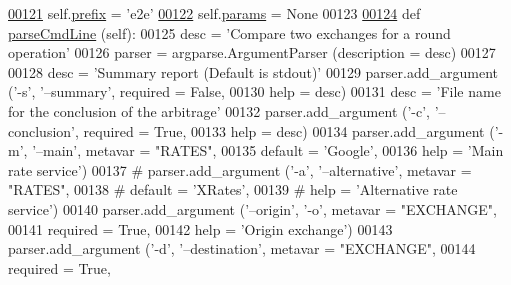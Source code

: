 \begin{DoxyCode}
{\hypertarget{e2e_8py_source.tex_l00121}{}\hyperlink{classe2e_1_1_application_a027ff25e5409ae17584978a09fc2611a}{00121}         self.\hyperlink{classe2e_1_1_application_a027ff25e5409ae17584978a09fc2611a}{prefix} = \textcolor{stringliteral}{'e2e'}
\hypertarget{e2e_8py_source.tex_l00122}{}\hyperlink{classe2e_1_1_application_a57206c6ccc86c2659edfd8d73d2029f3}{00122}         self.\hyperlink{classe2e_1_1_application_a57206c6ccc86c2659edfd8d73d2029f3}{params} = \textcolor{keywordtype}{None}
00123     
\hypertarget{e2e_8py_source.tex_l00124}{}\hyperlink{classe2e_1_1_application_a91b8b6df6456d27bed503849ffcdcc77}{00124}     \textcolor{keyword}{def }\hyperlink{classe2e_1_1_application_a91b8b6df6456d27bed503849ffcdcc77}{parseCmdLine} (self):
00125         desc = \textcolor{stringliteral}{'Compare two exchanges for a round operation'}
00126         parser = argparse.ArgumentParser (description = desc)
00127         
00128         desc = \textcolor{stringliteral}{'Summary report (Default is stdout)'} 
00129         parser.add\_argument (\textcolor{stringliteral}{'-s'}, \textcolor{stringliteral}{'--summary'}, required = \textcolor{keyword}{False},
00130                              help = desc)
00131         desc = \textcolor{stringliteral}{'File name for the conclusion of the arbitrage'}
00132         parser.add\_argument (\textcolor{stringliteral}{'-c'}, \textcolor{stringliteral}{'--conclusion'}, required = \textcolor{keyword}{True},
00133                              help = desc)
00134         parser.add\_argument (\textcolor{stringliteral}{'-m'}, \textcolor{stringliteral}{'--main'}, metavar = \textcolor{stringliteral}{"RATES"}, 
00135                              default = \textcolor{stringliteral}{'Google'},
00136                              help = \textcolor{stringliteral}{'Main rate service'})
00137 \textcolor{comment}{#        parser.add\_argument ('-a', '--alternative', metavar = "RATES",}
00138 \textcolor{comment}{#                             default = 'XRates',}
00139 \textcolor{comment}{#                             help = 'Alternative rate service')}
00140         parser.add\_argument (\textcolor{stringliteral}{'--origin'}, \textcolor{stringliteral}{'-o'}, metavar = \textcolor{stringliteral}{"EXCHANGE"},
00141                              required = \textcolor{keyword}{True},
00142                              help = \textcolor{stringliteral}{'Origin exchange'})
00143         parser.add\_argument (\textcolor{stringliteral}{'-d'}, \textcolor{stringliteral}{'--destination'}, metavar = \textcolor{stringliteral}{"EXCHANGE"},
00144                              required = \textcolor{keyword}{True},
}
\end{DoxyCode}
